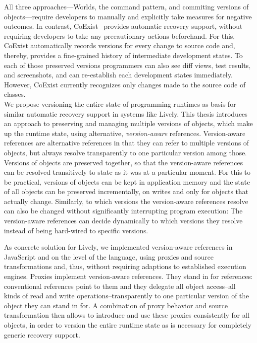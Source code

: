 All three approaches---Worlds, the command pattern, and commiting versions of objects---require developers to manually and explicitly take measures for negative outcomes.
In contrast, CoExist~\cite{Steinert2012COE} provides automatic recovery support, without requiring developers to take any precautionary actions beforehand.
For this, CoExist automatically records versions for every change to source code and, thereby, provides a fine-grained history of intermediate development states.
To each of those preserved versions programmers can also see diff views, test results, and screenshots, and can re-establish each development states immediately.
However, CoExist currently recognizes only changes made to the source code of classes.\\

We propose versioning the entire state of programming runtimes as basis for similar automatic recovery support in systems like Lively.
This thesis introduces an approach to preserving and managing multiple versions of objects, which make up the runtime state, using alternative, \emph{version-aware} references.
Version-aware references are alternative references in that they can refer to multiple versions of objects, but always resolve transparently to one particular version among those.
Versions of objects are preserved together, so that the version-aware references can be resolved transitively to state as it was at a particular moment.
For this to be practical, versions of objects can be kept in application memory and the state of all objects can be preserved incrementally, on writes and only for objects that actually change.
Similarly, to which versions the version-aware references resolve can also be changed without significantly interrupting program execution:
The version-aware references can decide dynamically to which versions they resolve instead of being hard-wired to specific versions.

As concrete solution for Lively, we implemented version-aware references in JavaScript and on the level of the language, using proxies and source transformations and, thus, without requiring adaptions to established execution engines.
Proxies implement version-aware references.
They stand in for references: conventional references point to them and they delegate all object access--all kinds of read and write operations--transparently to one particular version of the object they can stand in for.
A combination of proxy behavior and source transformation then allows to introduce and use these proxies consistently for all objects, in order to version the entire runtime state as is necessary for completely generic recovery support.

